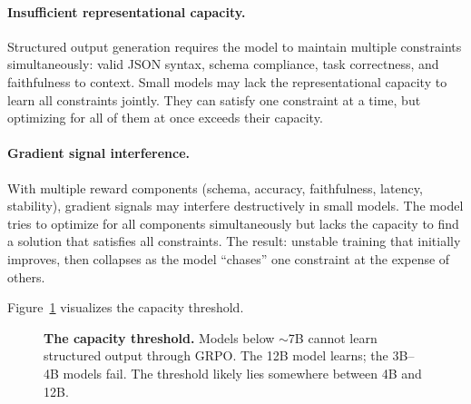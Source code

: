 \documentclass[11pt]{article}
\begin{document}
\paragraph{Insufficient representational capacity.}
Structured output generation requires the model to maintain multiple constraints simultaneously: valid JSON syntax, schema compliance, task correctness, and faithfulness to context.
Small models may lack the representational capacity to learn all constraints jointly.
They can satisfy one constraint at a time, but optimizing for all of them at once exceeds their capacity.

\paragraph{Gradient signal interference.}
With multiple reward components (schema, accuracy, faithfulness, latency, stability), gradient signals may interfere destructively in small models.
The model tries to optimize for all components simultaneously but lacks the capacity to find a solution that satisfies all constraints.
The result: unstable training that initially improves, then collapses as the model ``chases'' one constraint at the expense of others.

Figure~\ref{fig:threshold} visualizes the capacity threshold.

\begin{figure}[t]
\centering
{}
\caption{\textbf{The capacity threshold.} Models below $\sim$7B cannot learn structured output through GRPO. The 12B model learns; the 3B--4B models fail. The threshold likely lies somewhere between 4B and 12B.}
\label{fig:threshold}
\end{figure}
\end{document}
